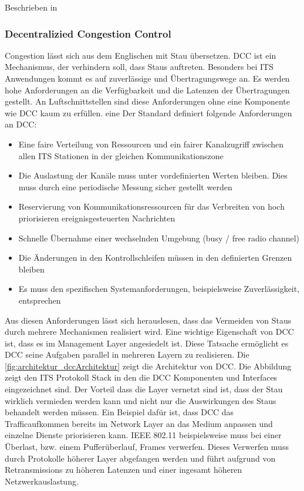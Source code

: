 Beschrieben in \cite{etsi102723-2}



\subsubsection{Decentralizied Congestion Control\label{architektur_dcc}}
Congestion lässt sich aus dem Englischen mit Stau übersetzen. \ac{DCC} ist ein Mechanismus, der verhindern soll, dass Staus auftreten. Besonders bei \ac{ITS} Anwendungen kommt es auf zuverlässige und Übertragungswege an. Es werden hohe Anforderungen an die Verfügbarkeit und die Latenzen der Übertragungen gestellt. An Luftschnittstellen sind diese Anforderungen ohne eine Komponente wie \ac{DCC} kaum zu erfüllen. eine Der Standard \cite{etsi102687} definiert folgende Anforderungen an \ac{DCC}:
\begin{itemize}
	\item Eine faire Verteilung von Ressourcen und ein fairer Kanalzugriff zwischen allen \ac{ITS} Stationen in der gleichen Kommunikationszone
	\item Die Auslastung der Kanäle muss unter vordefinierten Werten bleiben. Dies muss durch eine periodische Messung sicher gestellt werden
	\item Reservierung von Kommunikationsressourcen für das Verbreiten von hoch priorisieren ereignisgesteuerten Nachrichten
	\item Schnelle Übernahme einer wechselnden Umgebung (busy / free radio channel)
	\item Die Änderungen in den Kontrollschleifen müssen in den definierten Grenzen bleiben
	\item Es muss den spezifischen Systemanforderungen, beispielsweise Zuverlässigkeit, entsprechen
\end{itemize}

Aus diesen Anforderungen lässt sich herauslesen, dass das Vermeiden von Staus durch mehrere Mechanismen realisiert wird. Eine wichtige Eigenschaft von \ac{DCC} ist, dass es im Management Layer angesiedelt ist. Diese Tatsache ermöglicht es \ac{DCC} seine Aufgaben parallel in mehreren Layern zu realisieren. Die \ref{fig:architektur_dccArchitektur} zeigt die Architektur von \ac{DCC}. Die Abbildung zeigt den \ac{ITS} Protokoll Stack in den die \ac{DCC} Komponenten und Interfaces eingezeichnet sind. Der Vorteil dass die Layer vernetzt sind ist, dass der Stau wirklich vermieden werden kann und nicht nur die Auswirkungen des Staus behandelt werden müssen. Ein Beispiel dafür ist, dass \ac{DCC} das Trafficaufkommen bereits im Network Layer an das Medium anpassen und einzelne Dienste priorisieren kann. IEEE 802.11 beispielsweise muss bei einer Überlast, bzw. einem Pufferüberlauf, Frames verwerfen. Dieses Verwerfen muss durch Protokolle höherer Layer abgefangen werden und führt aufgrund von Retransmissions zu höheren Latenzen und einer ingesamt höheren Netzwerkauslastung. 

